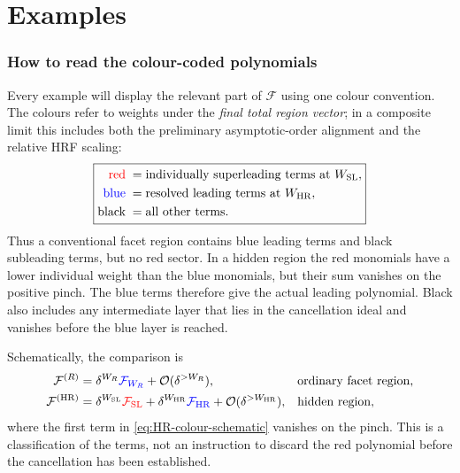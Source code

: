 \documentclass[a4paper,11pt]{article}
\newcommand{\HR}{\mathrm{HR}}
\newcommand{\FSL}{\mathcal F_{\rm SL}}
\newcommand{\WSL}{W_{\rm SL}}
\newcommand{\WHR}{W_{\rm HR}}
\newcommand{\SLcolour}[1]{{\color{red}#1}}
\newcommand{\HRcolour}[1]{{\color{blue}#1}}
\newcommand{\Othercolour}[1]{{\color{black}#1}}
\begin{document}
\part{Examples}

\section{How to read the colour-coded polynomials}
\label{sec:example-colours}

Every example will display the relevant part of \(\mathcal F\) using one
colour convention.  The colours refer to weights under the \emph{final total
region vector}; in a composite limit this includes both the preliminary
asymptotic-order alignment and the relative HRF scaling:
\begin{equation}
 \boxed{\begin{aligned}
 \SLcolour{\text{red}}\;&=\text{individually superleading terms at }\WSL,\\
 \HRcolour{\text{blue}}\;&=\text{resolved leading terms at }\WHR,\\
 \Othercolour{\text{black}}\;&=\text{all other terms}.
 \end{aligned}}
\label{eq:colour-key}
\end{equation}
Thus a conventional facet region contains blue leading terms and black
subleading terms, but no red sector.  In a hidden region the red monomials
have a lower individual weight than the blue monomials, but their sum
vanishes on the positive pinch.  The blue terms therefore give the actual
leading polynomial.  Black also includes any intermediate layer that lies
in the cancellation ideal and vanishes before the blue layer is reached.

Schematically, the comparison is
\begin{align}
 \mathcal F^{(R)}
 &=\delta^{W_R}\HRcolour{\mathcal F_{W_R}}
   +\Othercolour{\mathcal O(\delta^{>W_R})},
 &&\text{ordinary facet region},
\label{eq:facet-colour-schematic}\\
 \mathcal F^{(\HR)}
 &=\delta^{\WSL}\SLcolour{\FSL}
   +\delta^{\WHR}\HRcolour{\mathcal F_{\HR}}
   +\Othercolour{\mathcal O(\delta^{>\WHR})},
 &&\text{hidden region},
\label{eq:HR-colour-schematic}
\end{align}
where the first term in \eqref{eq:HR-colour-schematic} vanishes on the pinch.
This is a classification of the terms, not an instruction to discard the
red polynomial before the cancellation has been established.
\end{document}
